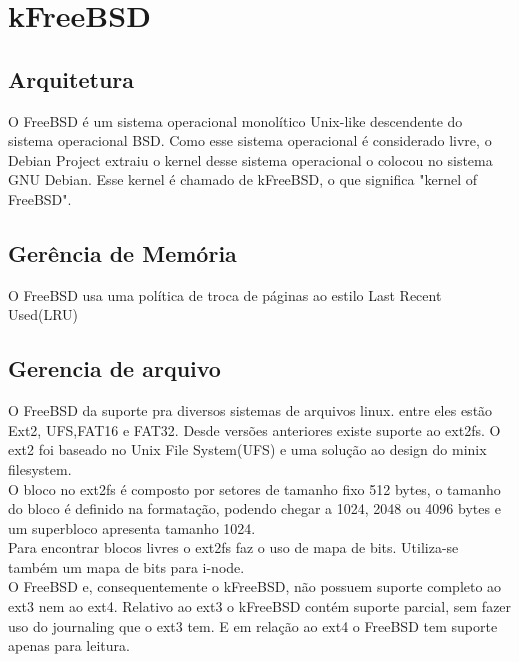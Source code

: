 \documentclass[conference]{IEEEtran}
\begin{document}
\section{kFreeBSD}\label{sec:BSD}

\subsection{Arquitetura}\label{sec:BSDArq}
O FreeBSD é um sistema operacional monolítico Unix-like descendente do sistema operacional BSD. Como esse sistema operacional é considerado livre, o Debian Project extraiu o kernel desse sistema operacional o colocou no sistema GNU Debian. Esse kernel é chamado de kFreeBSD, o que significa "kernel of FreeBSD".\cite{Debian-kFreeBSD-wiki}

\subsection{Gerência de Memória}\label{sec:BSDMem}
O FreeBSD usa uma política de troca de páginas ao estilo Last Recent Used(LRU)\cite{FreeBsdArc}

\subsection{Gerencia de arquivo}\label{sec:BSDArquivo}
O FreeBSD da suporte pra diversos sistemas de arquivos linux. entre eles estão Ext2, UFS,FAT16 e FAT32. Desde versões anteriores existe suporte ao ext2fs. O ext2 foi baseado no Unix File System(UFS) e uma solução ao design do minix filesystem.\\

O bloco no ext2fs é composto por setores de tamanho fixo 512 bytes, o tamanho do bloco é definido na formatação, podendo chegar a 1024, 2048 ou 4096 bytes e um superbloco apresenta tamanho 1024. \\ 
Para encontrar blocos livres o ext2fs faz o uso de mapa de bits. Utiliza-se também um mapa de bits para i-node.\\ 

O FreeBSD e, consequentemente o kFreeBSD, não possuem suporte completo ao ext3 nem ao ext4. Relativo ao ext3 o kFreeBSD contém suporte parcial, sem fazer uso do journaling que o ext3 tem. E em relação ao ext4 o FreeBSD tem suporte apenas para leitura.\cite{kFreeBSD-ext4}\\
\end{document}
